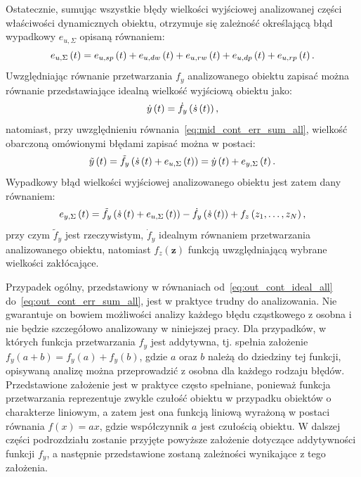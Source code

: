 Ostatecznie, sumując wszystkie błędy wielkości wyjściowej analizowanej części właściwości dynamicznych obiektu, otrzymuje się zależność określającą błąd wypadkowy $e_{u,\Sigma}$ opisaną równaniem:
\begin{equation}
e_{u,\Sigma} \left(t\right) = e_{u,sp} \left(t\right) + e_{u,dw} \left(t\right) + e_{u,rw} \left(t\right) + e_{u,dp} \left(t\right) + e_{u,rp} \left(t\right) \label{eq:mid_cont_err_sum_all}.
\end{equation}
Uwzględniając równanie przetwarzania $f_{y}$ analizowanego obiektu zapisać można równanie przedstawiające idealną wielkość wyjściową obiektu jako:
\begin{equation}
\dot{y} \left(t\right) = \dot{f}_{y} \left( \dot{s} \left(t\right) \right) \label{eq:out_cont_ideal_all},
\end{equation}
natomiast, przy uwzględnieniu równania~\eqref{eq:mid_cont_err_sum_all}, wielkość obarczoną omówionymi błędami zapisać można w postaci:
\begin{equation}
\tilde{y} \left(t\right) = \tilde{f}_{y} \left( \dot{s} \left(t\right) + e_{u,\Sigma} \left(t\right) \right) = \dot{y} \left(t\right) + e_{y,\Sigma} \left(t\right) \label{eq:out_cont_real_all}.
\end{equation}
Wypadkowy błąd wielkości wyjściowej analizowanego obiektu jest zatem dany równaniem:
\begin{equation}
e_{y,\Sigma} \left(t\right) = \tilde{f}_{y} \left( \dot{s} \left(t\right) + e_{u,\Sigma} \left(t\right) \right) - \dot{f}_{y} \left( \dot{s} \left(t\right) \right) + f_{z} \left( z_{1}, \hdots, z_{N} \right) \label{eq:out_cont_err_sum_all},
\end{equation}
przy czym $\tilde{f}_{y}$ jest rzeczywistym, $\dot{f}_{y}$ idealnym równaniem przetwarzania analizowanego obiektu, natomiast $f_{z}(\mathbf{z})$ funkcją uwzględniającą wybrane wielkości zakłócające.

Przypadek ogólny, przedstawiony w równaniach od~\eqref{eq:out_cont_ideal_all} do~\eqref{eq:out_cont_err_sum_all}, jest w praktyce trudny do analizowania. Nie gwarantuje on bowiem możliwości analizy każdego błędu cząstkowego z osobna i nie będzie szczegółowo analizowany w niniejszej pracy. Dla przypadków, w których funkcja przetwarzania $f_{y}$ jest addytywna, tj. spełnia założenie $f_{y}(a + b) = f_{y}(a) + f_{y}(b)$, gdzie $a$ oraz $b$ należą do dziedziny tej funkcji, opisywaną analizę można przeprowadzić z osobna dla każdego rodzaju błędów. Przedstawione założenie jest w praktyce często spełniane, ponieważ funkcja przetwarzania reprezentuje zwykle czułość obiektu w przypadku obiektów o charakterze liniowym, a zatem jest ona funkcją liniową wyrażoną w postaci równania $f(x) = ax$, gdzie współczynnik $a$ jest czułością obiektu. W dalszej części podrozdziału zostanie przyjęte powyższe założenie dotyczące addytywności funkcji $f_{y}$, a następnie przedstawione zostaną zależności wynikające z tego założenia.


